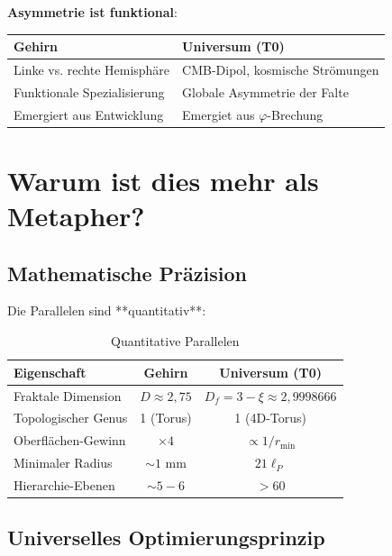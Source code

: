 	\begin{keyresult}
		\textbf{Asymmetrie ist funktional}:
		
		\vspace{0.3cm}
		
		\begin{center}
			\begin{tabular}{p{4cm}|p{4cm}}
				\toprule
				\textbf{Gehirn} & \textbf{Universum (T0)} \\
				\midrule
				Linke vs. rechte Hemisphäre & CMB-Dipol, kosmische Strömungen \\
				Funktionale Spezialisierung & Globale Asymmetrie der Falte \\
				Emergiert aus Entwicklung & Emergiet aus $\varphi$-Brechung \\
				\bottomrule
			\end{tabular}
		\end{center}
	\end{keyresult}
	
	\section{Warum ist dies mehr als Metapher?}
	
	\subsection{Mathematische Präzision}
	
	Die Parallelen sind **quantitativ**:
	
	\begin{table}[h]
		\centering
		\small
		\begin{tabular}{lcc}
			\toprule
			\textbf{Eigenschaft} & \textbf{Gehirn} & \textbf{Universum (T0)} \\
			\midrule
			Fraktale Dimension & $D \approx 2,75$ & $D_f = 3-\xi \approx 2,9998666$ \\
			Topologischer Genus & 1 (Torus) & 1 (4D-Torus) \\
			Oberflächen-Gewinn & $\times 4$ & $\propto 1/r_{\min}$ \\
			Minimaler Radius & $\sim 1$ mm & $21 \ell_P$ \\
			Hierarchie-Ebenen & $\sim 5-6$ & $>60$ \\
			\bottomrule
		\end{tabular}
		\caption{Quantitative Parallelen}
	\end{table}
	
	\subsection{Universelles Optimierungsprinzip}
	
